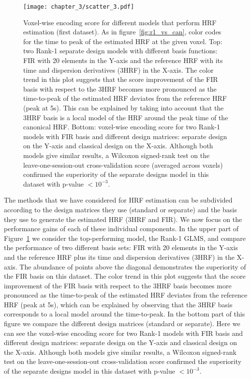 \begin{figure}[t] \centering
\texttt{[image: chapter\_3/scatter\_3.pdf]}
\caption{\label{fig:scatter2} Voxel-wise encoding score for different models
that perform HRF estimation (first dataset). As in figure~\ref{fig:r1_vs_can},
color codes for the time to peak of the estimated HRF at the given voxel.
Top: two Rank-1 separate design models with different basis functions: FIR with 
20 elements in the Y-axis and the reference HRF with its time and dispersion derivatives
(3HRF) in the X-axis. The color trend in this plot suggests that the score improvement 
of the FIR basis with respect to the 3HRF
becomes more pronounced as the time-to-peak of the estimated HRF 
deviates from the reference HRF (peak at 5s). This can be explained by taking into account that the 3HRF
basis is a local model of the HRF around the peak time of the canonical HRF.
Bottom: voxel-wise encoding score for two Rank-1 models with FIR basis and 
different design matrices: separate design on the Y-axis and classical
design on the X-axis. Although both models give similar results, a Wilcoxon
signed-rank test on the leave-one-session-out cross-validation score (averaged across voxels) confirmed the superiority of the separate designs model
in this dataset with p-value $<10^{-3}$.}
\end{figure}

The methods that we have considered for HRF estimation can be subdivided according
to the design matrices they use (standard or separate) and the basis they use
to generate the estimated HRF (3HRF and FIR). We now focus on the performance
gains of each of these individual components.
In the upper part of
Figure~\ref{fig:scatter2} we consider the top-performing model, the Rank-1
GLMS, and compare the performance of two different basis sets: FIR with 
20 elements in the Y-axis and the reference HRF plus its time and dispersion derivatives
(3HRF) in the X-axis. The abundance of points above the diagonal 
demonstrates the superiority of the FIR basis on this dataset.
The color trend in this plot suggests that the score improvement of the FIR basis
with respect to the 3HRF basis
becomes more pronounced as the time-to-peak of the estimated HRF 
deviates from the reference HRF (peak at 5s), which can be explained by observing that 
the 3HRF basis corresponds to a local model around the time-to-peak. 
In the bottom part of this figure 
we compare the different design matrices (standard or separate). Here
we can see the voxel-wise encoding score for two Rank-1 models with FIR basis and 
different design matrices: separate design on the Y-axis and classical
design on the X-axis. Although both models give similar results, a Wilcoxon
signed-rank test on the leave-one-session-out cross-validation score confirmed the superiority of the separate designs model
in this dataset with p-value $<10^{-3}$.


